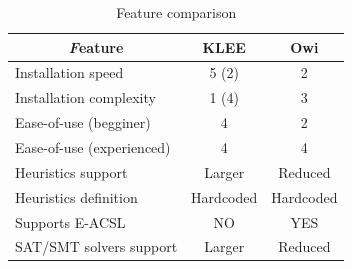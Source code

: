 \begin{table}[tb]
    \centering
    \caption{Feature comparison}
    \begin{tabular}{l|c|c}
       \multicolumn{1}{c|}{\textit Feature} & \multicolumn{1}{c|}{KLEE} & \multicolumn{1}{c}{Owi} \\
       \hline
       \hline
        Installation speed & 5 (2) & 2 \\
        Installation complexity & 1 (4) & 3 \\
        Ease-of-use (begginer) & 4 & 2 \\
        Ease-of-use (experienced) & 4 & 4 \\
        \hline
        \hline
        Heuristics support & Larger & Reduced \\
        Heuristics definition & Hardcoded & Hardcoded \\
        Supports E-ACSL & NO & YES \\
        \hline
        \hline
        SAT/SMT solvers support & Larger & Reduced \\
    \end{tabular}
    \label{tab:feature_comparison}
\end{table}

